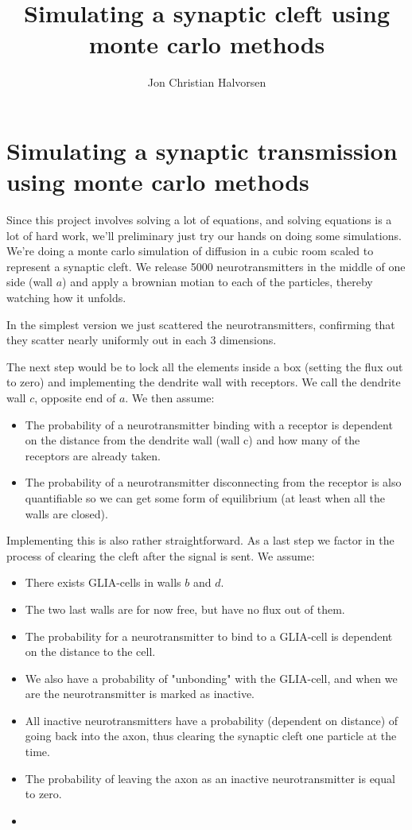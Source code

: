 \documentclass{article}
\title{Simulating a synaptic cleft using monte carlo methods}
\author{Jon Christian Halvorsen }
\begin{document}
\maketitle

\section*{Simulating a synaptic transmission using monte carlo methods}

Since this project involves solving a lot of equations, and solving equations is a lot of hard work, we'll preliminary just try our hands on doing some simulations. We're doing a monte carlo simulation of diffusion in a cubic room scaled to represent a synaptic cleft. We release 5000 neurotransmitters in the middle of one side (wall $a$) and apply a brownian motian to each of the particles, thereby watching how it unfolds.

In the simplest version we just scattered the neurotransmitters, confirming that they scatter nearly uniformly out in each 3 dimensions.

The next step would be to lock all the elements inside a box (setting the flux out to zero) and implementing the dendrite wall with receptors. We call the dendrite wall $c$, opposite end of       $a$. We then assume:
\begin{itemize}
\item The probability of a neurotransmitter binding with a receptor is dependent on the distance from the dendrite wall (wall c) and how many of the receptors are already taken.
\item The probability of a neurotransmitter disconnecting from the receptor is also quantifiable so we can get some form of equilibrium  (at least when all the walls are closed).
\end{itemize}

Implementing this is also rather straightforward. As a last step we factor in the process of clearing the cleft after the signal is sent. We assume:
\begin{itemize}
\item There exists GLIA-cells in walls $b$ and $d$.
\item The two last walls are for now free, but have no flux out of them.
\item The probability for a neurotransmitter to bind to a GLIA-cell is dependent on the distance to the cell.
\item We also have a probability of "unbonding" with the GLIA-cell, and when we are the neurotransmitter is marked as inactive.
\item All inactive neurotransmitters have a probability (dependent on distance) of going back into the axon, thus clearing the synaptic cleft one particle at the time.
\item The probability of leaving the axon as an inactive neurotransmitter is equal to zero.
\item 
\end{itemize}
\end{document}
